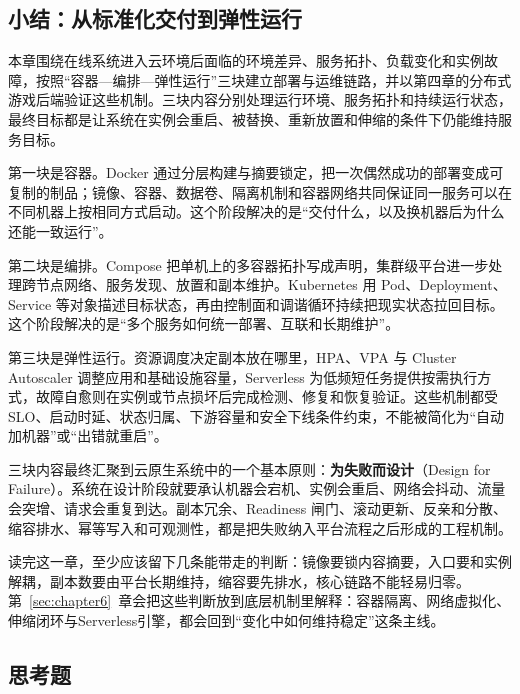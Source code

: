 \subsection{小结：从标准化交付到弹性运行}

本章围绕在线系统进入云环境后面临的环境差异、服务拓扑、负载变化和实例故障，按照“容器—编排—弹性运行”三块建立部署与运维链路，并以第四章的分布式游戏后端验证这些机制。三块内容分别处理运行环境、服务拓扑和持续运行状态，最终目标都是让系统在实例会重启、被替换、重新放置和伸缩的条件下仍能维持服务目标。

第一块是容器。Docker 通过分层构建与摘要锁定，把一次偶然成功的部署变成可复制的制品；镜像、容器、数据卷、隔离机制和容器网络共同保证同一服务可以在不同机器上按相同方式启动。这个阶段解决的是“交付什么，以及换机器后为什么还能一致运行”。

第二块是编排。Compose 把单机上的多容器拓扑写成声明，集群级平台进一步处理跨节点网络、服务发现、放置和副本维护。Kubernetes 用 Pod、Deployment、Service 等对象描述目标状态，再由控制面和调谐循环持续把现实状态拉回目标。这个阶段解决的是“多个服务如何统一部署、互联和长期维护”。

第三块是弹性运行。资源调度决定副本放在哪里，HPA、VPA 与 Cluster Autoscaler 调整应用和基础设施容量，Serverless 为低频短任务提供按需执行方式，故障自愈则在实例或节点损坏后完成检测、修复和恢复验证。这些机制都受 SLO、启动时延、状态归属、下游容量和安全下线条件约束，不能被简化为“自动加机器”或“出错就重启”。

三块内容最终汇聚到云原生系统中的一个基本原则：\textbf{为失败而设计}（Design for Failure）。系统在设计阶段就要承认机器会宕机、实例会重启、网络会抖动、流量会突增、请求会重复到达。副本冗余、Readiness 闸门、滚动更新、反亲和分散、缩容排水、幂等写入和可观测性，都是把失败纳入平台流程之后形成的工程机制。

读完这一章，至少应该留下几条能带走的判断：镜像要锁内容摘要，入口要和实例解耦，副本数要由平台长期维持，缩容要先排水，核心链路不能轻易归零。第~\ref{sec:chapter6}~章会把这些判断放到底层机制里解释：容器隔离、网络虚拟化、伸缩闭环与Serverless引擎，都会回到“变化中如何维持稳定”这条主线。

\subsection{思考题}

